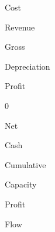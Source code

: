\documentclass[a4paper,portrait,12pt]{article}
\begin{document}
\begin{flushleft}
Cost
\end{flushleft}





\begin{flushleft}
Revenue
\end{flushleft}





\begin{flushleft}
Gross
\end{flushleft}





\begin{flushleft}
Depreciation
\end{flushleft}





\begin{flushleft}
Profit
\end{flushleft}


0





\begin{flushleft}
Net
\end{flushleft}





\begin{flushleft}
Cash
\end{flushleft}





\begin{flushleft}
Cumulative
\end{flushleft}





\begin{flushleft}
Capacity
\end{flushleft}





\begin{flushleft}
Profit
\end{flushleft}





\begin{flushleft}
Flow
\end{flushleft}
\end{document}
